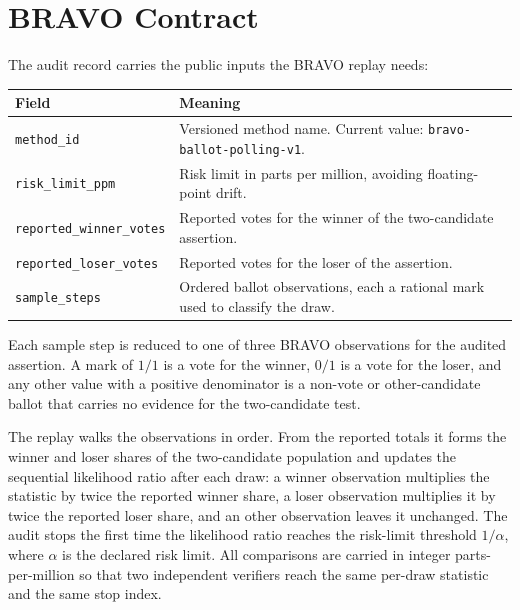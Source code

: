 \section{BRAVO Contract}

The audit record carries the public inputs the BRAVO replay needs:

\begin{center}
\small
\begin{tabularx}{\textwidth}{lX}
\toprule
Field & Meaning \\
\midrule
\texttt{method\_id} & Versioned method name. Current value: \texttt{bravo-ballot-polling-v1}. \\
\texttt{risk\_limit\_ppm} & Risk limit in parts per million, avoiding floating-point drift. \\
\texttt{reported\_winner\_votes} & Reported votes for the winner of the two-candidate assertion. \\
\texttt{reported\_loser\_votes} & Reported votes for the loser of the assertion. \\
\texttt{sample\_steps} & Ordered ballot observations, each a rational mark used to classify the draw. \\
\bottomrule
\end{tabularx}
\end{center}

Each sample step is reduced to one of three BRAVO observations for the audited
assertion. A mark of $1/1$ is a vote for the winner, $0/1$ is a vote for the
loser, and any other value with a positive denominator is a non-vote or
other-candidate ballot that carries no evidence for the two-candidate test.

The replay walks the observations in order. From the reported totals it forms
the winner and loser shares of the two-candidate population and updates the
sequential likelihood ratio after each draw: a winner observation multiplies the
statistic by twice the reported winner share, a loser observation multiplies it
by twice the reported loser share, and an other observation leaves it unchanged.
The audit stops the first time the likelihood ratio reaches the risk-limit
threshold $1/\alpha$, where $\alpha$ is the declared risk limit. All comparisons
are carried in integer parts-per-million so that two independent verifiers reach
the same per-draw statistic and the same stop index.
